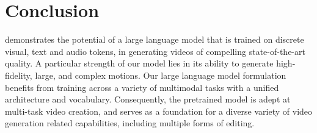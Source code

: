 \vspace{-2mm}
\section{Conclusion}
\vspace{-1mm}

\modelname{} demonstrates the potential of a large language model that is trained on discrete visual, text and audio tokens, in generating videos of compelling state-of-the-art quality.
%
A particular strength of our model lies in its ability to
generate high-fidelity, large, and complex motions.
Our large language model formulation benefits from training
across a variety of multimodal tasks with a unified architecture and vocabulary.
%
Consequently, the pretrained model is adept at multi-task video creation, and serves as a foundation for a diverse variety of video generation related capabilities, including multiple forms of editing.
